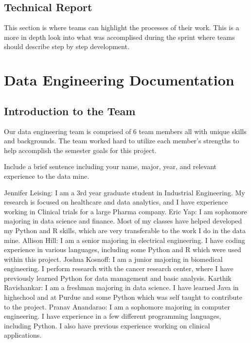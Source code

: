 \documentclass[]{book}
\begin{document}
\hypertarget{technical-report}{%
\section{Technical Report}\label{technical-report}}

This section is where teams can highlight the processes of their work. This is a more in depth look into what was accomplised during the sprint where teams should describe step by step development.

\hypertarget{data-engineering-documentation}{%
\chapter{Data Engineering Documentation}\label{data-engineering-documentation}}

\hypertarget{introduction-to-the-team}{%
\section{Introduction to the Team}\label{introduction-to-the-team}}

Our data engineering team is comprised of 6 team members all with unique skills and backgrounds. The team worked hard to utilize each member's strengths to help accomplish the semester goals for this project.

Include a brief sentence including your name, major, year, and relevant experience to the data mine.

Jennifer Leising: I am a 3rd year graduate student in Industrial Engineering. My research is focused on healthcare and data analytics, and I have experience working in Clinical trials for a large Pharma company.
Eric Yap: I am sophomore majoring in data science and finance. Most of my classes have helped developed my Python and R skills, which are very transferable to the work I do in the data mine.
Allison Hill: I am a senior majoring in electrical engineering. I have coding experience in various languages, including some Python and R which were used within this project.
Joshua Kosnoff: I am a junior majoring in biomedical engineering. I perform research with the cancer research center, where I have previously learned Python for data management and basic analysis.
Karthik Ravishankar: I am a freshman majoring in data science. I have learned Java in highschool and at Purdue and some Python which was self taught to contribute to the project.
Pranav Anandarao: I am a sophomore majoring in computer engineering. I have experience in a few different programming languages, including Python. I also have previous experience working on clinical applications.
\end{document}
